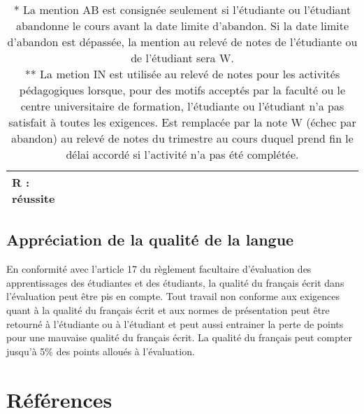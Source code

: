 \documentclass[12]{article}
\begin{document}
\begin{center}
\begin{table}[h]
\begin{tabular}{| p{0.2\linewidth} | p{0.2\linewidth} | p{0.2\linewidth} | p{0.2\linewidth} | p{0.2\linewidth} | }
{            R : réussite\hfill\hfill} \\
		\hline
		\end{tabular}
		\caption*{* La mention AB est consignée seulement si l’étudiante ou l’étudiant abandonne le cours avant la date
		limite d'abandon. Si la date limite d’abandon est dépassée, la mention au relevé de notes de l’étudiante
		ou de l’étudiant sera W.\\
		** La metion IN est utilisée au relevé de notes pour les activités
		pédagogiques lorsque, pour des motifs acceptés par la faculté ou le
		centre universitaire de formation, l’étudiante ou l’étudiant n’a pas
		satisfait à toutes les exigences. Est remplacée par la note W (échec
		par abandon) au relevé de notes du trimestre au cours duquel prend fin
		le délai accordé si l’activité n’a pas été complétée.}
		\end{table}
	\end{center}

    \subsection*{Appréciation de la qualité de la langue}

    En conformité avec l'article 17 du règlement facultaire d'évaluation
    des apprentissages des étudiantes et des étudiants, la qualité du français
    écrit dans l’évaluation peut être pis en compte. Tout travail non conforme
    aux exigences quant à la qualité du français écrit et aux normes de
    présentation  peut être retourné à l'étudiante ou à l'étudiant et peut aussi
    entrainer la perte de points pour une mauvaise qualité du français écrit.
    La qualité du français peut compter jusqu'à 5\% des points alloués à
    l'évaluation.

	
	
    
    

	\section*{Références}
\end{document}
